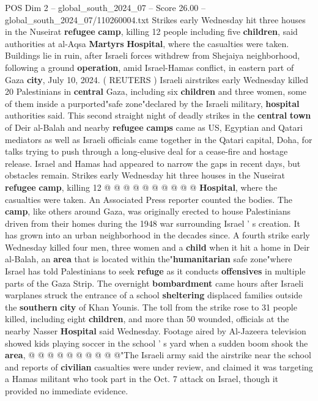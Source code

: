 \begin{textsample}{POS Dim 2 – global\_south\_2024\_07 – Score 26.00 – global\_south\_2024\_07/110260004.txt}  \label{ex:f2_pos_165}
Strikes early Wednesday hit three houses in the Nuseirat \textbf{refugee} \textbf{camp}, killing 12 people including five \textbf{children}, said authorities at al-Aqsa \textbf{Martyrs} \textbf{Hospital}, where the casualties were taken.
Buildings lie in ruin, after Israeli forces withdrew from Shejaiya neighborhood, following a ground \textbf{operation}, amid Israel-Hamas conflict, in eastern part of Gaza \textbf{city}, July 10, 2024. ( REUTERS ) Israeli airstrikes early Wednesday killed 20 Palestinians in \textbf{central} Gaza, including six \textbf{children} and three women, some of them inside a purported"safe zone"declared by the Israeli military, \textbf{hospital} authorities said.
This second straight night of deadly strikes in the \textbf{central} \textbf{town} of Deir al-Balah and nearby \textbf{refugee} \textbf{camps} came as US, Egyptian and Qatari mediators as well as Israeli officials came together in the Qatari capital, Doha, for talks trying to push through a long-elusive deal for a cease-fire and hostage release.
Israel and Hamas had appeared to narrow the gaps in recent days, but obstacles remain.
Strikes early Wednesday hit three houses in the Nuseirat \textbf{refugee} \textbf{camp}, killing 12 @ @ @ @ @ @ @ @ @ @ \textbf{Hospital}, where the casualties were taken.
An Associated Press reporter counted the bodies.
The \textbf{camp}, like others around Gaza, was originally erected to house Palestinians driven from their homes during the 1948 war surrounding Israel ' s creation.
It has grown into an urban neighborhood in the decades since.
A fourth strike early Wednesday killed four men, three women and a \textbf{child} when it hit a home in Deir al-Balah, an \textbf{area} that is located within the"\textbf{humanitarian} safe zone"where Israel has told Palestinians to seek \textbf{refuge} as it conducts \textbf{offensives} in multiple parts of the Gaza Strip.
The overnight \textbf{bombardment} came hours after Israeli warplanes struck the entrance of a school \textbf{sheltering} displaced families outside the \textbf{southern} \textbf{city} of Khan Younis.
The toll from the strike rose to 31 people killed, including eight \textbf{children}, and more than 50 wounded, officials at the nearby Nasser \textbf{Hospital} said Wednesday.
Footage aired by Al-Jazeera television showed kids playing soccer in the school ' s yard when a sudden boom shook the \textbf{area}, @ @ @ @ @ @ @ @ @ @"The Israeli army said the airstrike near the school and reports of \textbf{civilian} casualties were under review, and claimed it was targeting a Hamas militant who took part in the Oct. 7 attack on Israel, though it provided no immediate evidence.

\end{textsample}
